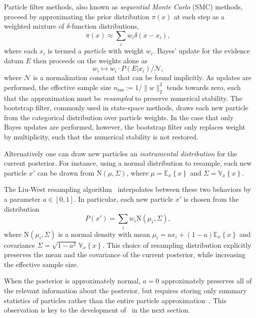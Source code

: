 \documentclass[twoside]{article}
\newcommand{\expect}[2]{{\mathbb{E}_{#2}}\!\left\{#1 \right\}}
\newcommand{\var}[2]{{\mathbb{V}_{#2}}\!\left\{#1 \right\}}
\newcommand{\CRej}{\text{rejection filtering}}
\newcommand{\ess}{\mathrm{ess}}
\newcommand{\NN}{\mathrm{N}}
\newcommand{\defeq}{\mathrel{:=}}
\begin{document}
Particle filter methods, also known as \emph{sequential Monte Carlo} (SMC) methods, proceed
by approximating the prior distribution $\pi(x)$ at each step as a weighted
mixture of $\delta$-function distributions,
\begin{equation}
    \pi(x) \approx \sum_i w_i \delta(x - x_i),
\end{equation}
where each $x_i$ is termed a \emph{particle} with weight $w_i$.
Bayes' update for the evidence datum $E$ then proceeds on the weights alone as
\begin{equation}
    w_i \mapsto w_i \cdot P(E | x_i) / \mathcal{N},
\end{equation}
where $\mathcal{N}$ is a normalization constant that can be found implicitly.
As updates are performed, the effective sample size $n_\ess \defeq
1 / \|w\|_2^2$ tends towards zero, such that the approximation must be
\emph{resampled} to preserve numerical stability. The bootstrap filter,
commonly used in state-space methods, draws each new particle from the categorical
distribution over particle weights. In the case that only Bayes updates are
performed, however, the bootstrap filter only replaces weight by multiplicity,
such that the numerical stability is not restored.

Alternatively one can draw new particles an \emph{instrumental distribution} for
the current posterior. For instance, using a normal distribution to resample,
each new particle $x'$ can be drawn from $\NN(\mu, \Sigma)$, where
$\mu = \expect{x}{x}$ and $\Sigma = \var{x}{x}$.

The Liu-West resampling algorithm~\cite{liu2001combined} interpolates between these two
behaviors by a parameter $a \in [0, 1]$. In particular, each new particle
$x'$ is chosen from the distribution
\begin{equation}
  \label{eq:liu-west}
  P(x') = \sum_i w_i \NN(\mu_i, \Sigma),
\end{equation}
where $\NN(\mu_i, \Sigma)$ is a normal density with mean
$\mu_i = a x_i + (1 - a) \expect xx$
and covariance $\Sigma = \sqrt{1 - a^2}\,\var{x}{x}$.
This choice of resampling distribution explicitly preserves the mean
and the covariance of the current posterior, while increasing the
effective sample size.

When the posterior is approximately normal, $a = 0$ approximately
preserves all of the relevant information about the posterior, but requires
storing only summary statistics of particles rather than the entire particle
approximation~\cite{sisson_sequential_2007,del2012adaptive}.   This observation is key to
the development of \CRej~in the next section.
\end{document}
